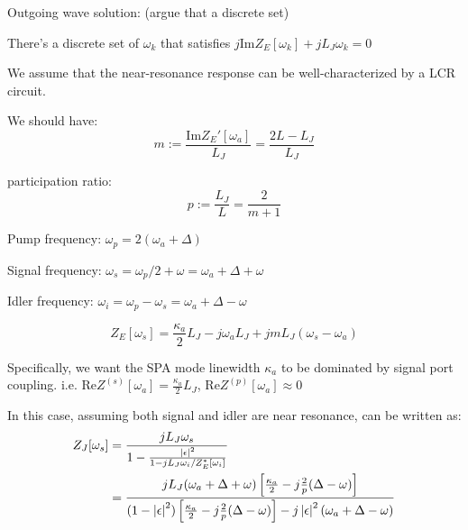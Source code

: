 \documentclass{article}
\renewcommand{\Re}{\mathrm{Re}}
\renewcommand{\Im}{\mathrm{Im}}
\begin{document}


Outgoing wave solution: 
(argue that a discrete set)


There's a discrete set of ${\omega_k}$ that satisfies $j \Im Z_E[\omega_k] + j L_J \omega_k = 0$

We assume that the near-resonance response can be well-characterized by a LCR circuit. 

We should have: 
\begin{equation}\label{eq:m}
m:= \frac{\Im Z_E'[\omega_a]}{L_J} = \frac{2L - L_J}{L_J}
\end{equation}

participation ratio: 
\begin{equation}
p:= \frac{L_J}{L} = \frac{2}{m + 1}
\end{equation}



Pump frequency: $\omega_p = 2 (\omega_a + \Delta)$

Signal frequency: $\omega_s = \omega_p/2 + \omega = \omega_a + \Delta + \omega$

Idler frequency: $\omega_i = \omega_p - \omega_s = \omega_a + \Delta - \omega$

\begin{equation}\label{eq:ZE}
Z_E[\omega_s]= \frac{\kappa_a}{2}L_J - j \omega_a L_J + j m L_J (\omega_s - \omega_a)
\end{equation}


Specifically, we want the SPA mode linewidth $\kappa_a$ to be dominated by signal port coupling.
i.e. $\Re Z^{(s)}[\omega_a]= \frac{\kappa_a}{2}L_J$, $\Re Z^{(p)}[\omega_a] \approx 0$

In this case, assuming both signal and idler are near resonance,  can be written as: 
\begin{equation}\label{eq:ZJ'}
\begin{aligned}
	Z_J[\omega_s] &= \frac{j L_J \omega_s }{1 - \frac{\left | \epsilon \right |^2}{1 - jL_J \omega_i/Z_E^*[\omega_i]}}\\
	&= \frac{j L_J (\omega_a + \Delta + \omega) \left[ \frac{\kappa_a}{2} - j \frac{2}{p}(\Delta - \omega)\right]}{(1-\left | \epsilon \right |^2)\left[ \frac{\kappa_a}{2} - j \frac{2}{p}(\Delta - \omega)\right] - j \left | \epsilon \right |^2 (\omega_a + \Delta - \omega)}
\end{aligned}
\end{equation}
\end{document}
